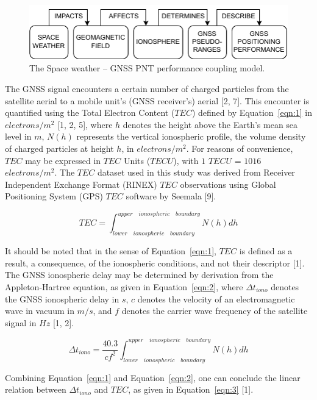 \let\LaTeXcline\cline\documentclass[sn-mathphys-num]{sn-jnl}\let\cline\LaTeXcline
\begin{document}
\begin{figure}[!ht]
 \centering
 \includegraphics[width=0.89\linewidth]{SpaceWeather-TwoLines.drawio.pdf}
    \caption{The Space weather – GNSS PNT performance coupling model.}
    \label{fig:SpaceWeather}
\end{figure}

The GNSS signal encounters a certain number of charged particles from the satellite aerial to a mobile unit’s (GNSS receiver’s) aerial [2, 7]. This encounter is quantified using the Total Electron Content ($TEC$) defined by Equation~\ref{eqn:1} in $electrons/m^{2}$ [1, 2, 5], where $h$ denotes the height above the Earth’s mean sea level in $m$, $N(h)$ represents the vertical ionospheric profile, the volume density of charged particles at height $h$, in $electrons/m^{2}$. For reasons of convenience, $TEC$ may be expressed in $TEC$ Units ($TECU$), with $1$ $TECU$ = $1016$ $electrons/m^{2}$. The $TEC$ dataset used in this study was derived from Receiver Independent Exchange Format (RINEX) $TEC$ observations using Global Positioning System (GPS) $TEC$ software by Seemala [9].

\begin{equation}
	TEC = \int_{lower \quad ionospheric \quad boundary}^{upper \quad ionospheric \quad boundary}N(h)dh
	\label{eqn:1}
\end{equation}

It should be noted that in the sense of Equation~\ref{eqn:1}, $TEC$ is defined as a result, a consequence, of the ionospheric conditions, and not their descriptor [1]. The GNSS ionospheric delay may be determined by derivation from the Appleton-Hartree equation, as given in Equation~\ref{eqn:2}, where $\Delta t_{iono}$ denotes the GNSS ionospheric delay in $s$, $c$ denotes the velocity of an electromagnetic wave in vacuum in $m/s$, and $f$ denotes the carrier wave frequency of the satellite signal in $Hz$ [1, 2].

\begin{equation}
	\Delta t_{iono} = \frac{40.3}{c f^{2}} \int_{lower \quad ionospheric \quad boundary}^{upper \quad ionospheric \quad boundary}N(h)dh
	\label{eqn:2}
\end{equation}

Combining Equation~\ref{eqn:1} and Equation~\ref{eqn:2}, one can conclude the linear relation between $\Delta t_{iono}$ and $TEC$, as given in Equation~\ref{eqn:3} [1].
\end{document}
